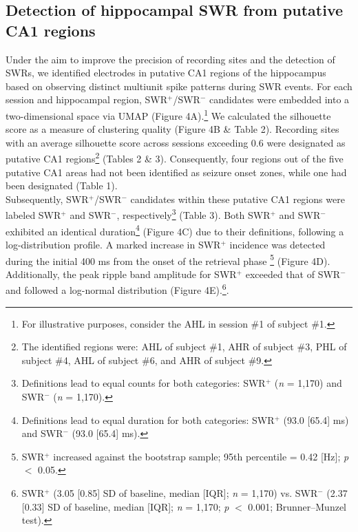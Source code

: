 \subsection{Detection of hippocampal SWR from putative CA1 regions}
Under the aim to improve the precision of recording sites and the detection of SWRs, we identified electrodes in putative CA1 regions of the hippocampus based on observing distinct multiunit spike patterns during SWR events. For each session and hippocampal region, SWR$^+$/SWR$^-$ candidates were embedded into a two-dimensional space via UMAP (Figure 4A).\footnote{For illustrative purposes, consider the AHL in session \#1 of subject \#1.} We calculated the silhouette score as a measure of clustering quality (Figure 4B \& Table 2). Recording sites with an average silhouette score across sessions exceeding 0.6 were designated as putative CA1 regions\footnote{The identified regions were: AHL of subject \#1, AHR of subject \#3, PHL of subject \#4, AHL of subject \#6, and AHR of subject \#9.}  (Tables 2 \& 3). Consequently, four regions out of the five putative CA1 areas had not been identified as seizure onset zones, while one had been designated (Table 1).
\\
\indent
Subsequently, SWR$^+$/SWR$^-$ candidates within these putative CA1 regions were labeled SWR$^+$ and SWR$^-$, respectively\footnote{Definitions lead to equal counts for both categories: SWR$^+$ (\textit{n} = 1,170) and SWR$^-$ (\textit{n} = 1,170).}  (Table 3). Both SWR$^+$ and SWR$^-$ exhibited an identical duration\footnote{Definitions lead to equal duration for both categories: SWR$^+$ (93.0 [65.4] ms) and SWR$^-$ (93.0 [65.4] ms).}  (Figure 4C) due to their definitions, following a log-distribution profile. A marked increase in SWR$^+$ incidence was detected during the initial 400 ms from the onset of the retrieval phase \footnote{SWR$^+$ increased against the bootstrap sample; 95th percentile = 0.42 [Hz]; \textit{p} $<$ 0.05.}  (Figure 4D). Additionally, the peak ripple band amplitude for SWR$^+$ exceeded that of SWR$^-$ and followed a log-normal distribution (Figure 4E).\footnote{SWR$^+$ (3.05 [0.85] SD of baseline, median [IQR]; \textit{n} = 1,170) vs. SWR$^-$ (2.37 [0.33] SD of baseline, median [IQR]; \textit{n} = 1,170; \textit{p} $<$ 0.001; Brunner--Munzel test).}.

